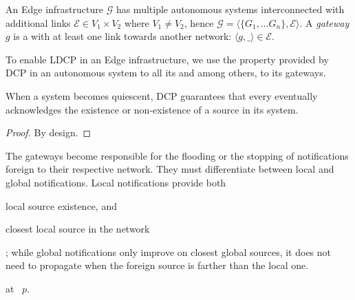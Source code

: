 \begin{definition}
  An Edge infrastructure $\mathcal{G}$ has multiple autonomous systems
  interconnected with additional links $\mathcal{E} \in V_1 \times
  V_2$ where $V_1 \neq V_2$, hence $\mathcal{G} = \langle \{G_1,
  \ldots G_n\}, \mathcal{E} \rangle$. A \emph{gateway} $g$ is a
  \process with at least one link towards another network: $\langle g,
  \_ \rangle \in \mathcal{E}$.
\end{definition}

\begin{definition}
\end{definition}

To enable LDCP in an Edge infrastructure, we use the property provided
by DCP in an autonomous system to all its \processes and among others,
to its gateways.

\begin{lemma}
  When a system becomes quiescent, DCP guarantees that every \process
  eventually acknowledges the existence or non-existence of a source
  in its system.
\end{lemma}

\begin{proof}
  By design.
\end{proof}

The gateways become responsible for the flooding or the stopping of
notifications foreign to their respective network. They must
differentiate between local and global notifications. Local
notifications provide both \begin{inparaenum}[(i)]
\item local source existence, and
\item closest local source in the network
\end{inparaenum}; while global notifications only improve on closest global sources,
\ie it does not need to propagate when the foreign source is farther
than the local one.

\begin{definition}
\end{definition} 



\begin{algorithm}[h]
  
  \caption{\label{algo:xascast}\NAMEC at \Process~$p$. }
\end{algorithm}


